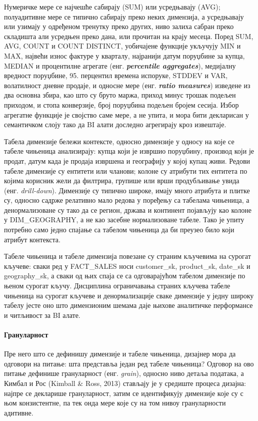 Нумеричке мере се најчешће сабирају (SUM) или усредњавају (AVG); полуадитивне мере се типично сабирају преко неких димензија, а усредњавају или узимају у одређеном тренутку преко других, ниво залиха сабран преко складишта али усредњен преко дана, или прочитан на крају месеца. Поред SUM, AVG, COUNT и COUNT DISTINCT, уобичајене функције укључују MIN и MAX, највећи износ фактуре у кварталу, најранији датум поруџбине за купца, MEDIAN и процентилне агрегате (енг. \textbf{\textit{percentile aggregates}}), медијалну вредност поруџбине, 95. перцентил времена испоруке, STDDEV и VAR, волатилност дневне продаје, и односне мере (енг. \textbf{\textit{ratio measures}}) изведене из два основна збира, као што су бруто маржа, приход минус трошак подељен приходом, и стопа конверзије, број поруџбина подељен бројем сесија. Избор агрегатне функције је својство саме мере, а не упита, и мора бити декларисан у семантичком слоју тако да BI алати доследно агрегирају кроз извештаје.

Табела димензије бележи контексте, односно димензије у односу на које се табеле чињеница анализирају: купца који је извршио поруџбину, производ који је продат, датум када је продаја извршена и географију у којој купац живи. Редови табеле димензије су ентитети или чланови; колоне су атрибути тих ентитета по којима корисник жели да филтрира, групише или врши продубљивање увида (енг. \textit{drill-down}). Димензије су типично широке, имају много атрибута и плитке су, односно садрже релативно мало редова у поређењу са табелама чињеница, а денормализоване су тако да се регион, држава и континент појављују као колоне у DIM\_GEOGRAPHY, а не као засебне нормализоване табеле. Тако је упиту потребно само једно спајање са табелом чињеница да би преузео било који атрибут контекста.

Табеле чињеница и табеле димензија повезане су страним кључевима на сурогат кључеве: сваки ред у FACT\_SALES носи customer\_sk, product\_sk, date\_sk и geography\_sk, а сваки од њих спаја се са одговарајућом табелом димензије по њеном сурогат кључу. Дисциплина ограничавања страних кључева табеле чињеница на сурогат кључеве и денормализације сваке димензије у једну широку табелу јесте оно што димензионим шемама даје њихове аналитичке перформансе и читљивост за BI алате.

\paragraph{Грануларност}
Пре него што се дефинишу димензије и табеле чињеница, дизајнер мора да одговори на питање: шта представља један ред табеле чињеница? Одговор на ово питање дефинише грануларност (енг. \textit{grain}), односно ниво детаља података, а Кимбал и Рос (Kimball \& Ross, 2013) стављају је у средиште процеса дизајна: најпре се декларише грануларност, затим се идентификују димензије које су с њом конзистентне, па тек онда мере које су на том нивоу грануларности адитивне.

